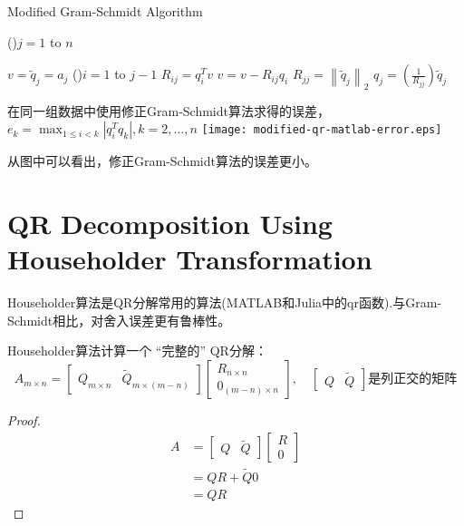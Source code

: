 \begin{example}
    \begin{algorithm}[htbp]
        \caption{Modified Gram-Schmidt Algorithm}
        \For(){$j=1$ to $n$}{
            $v={\tilde{q} }_j =a_j$\;
            \For(){$i=1$ to $j-1$}{
                $R_{ij} = q_i^T v$\;
                $v = v - R_{ij} q_i$\;
            }
            $R_{ jj} ={\left\|{\tilde{q} }_j \right\|}_2$\;
            $q_j =\left(\frac{1}{R_{jj} }\right){\tilde{q} }_j$\;

        }
    \end{algorithm}


    \begin{FigureCenter}{在同一组数据中使用修正Gram-Schmidt算法求得的误差，$e_{k}=\max _{1 \leq i<k}\left|q_{i}^{T} q_{k}\right|,  k=2, \ldots, n$}
        \texttt{[image: modified-qr-matlab-error.eps]}
    \end{FigureCenter}

    从图中可以看出，修正Gram-Schmidt算法的误差更小。
\end{example}

\section{QR Decomposition Using Householder Transformation}

Householder算法是QR分解常用的算法(MATLAB和Julia中的qr函数).与Gram-Schmidt相比，对舍入误差更有鲁棒性。

Householder算法计算一个 “完整的” QR分解：
\begin{equation} A_{m \times n}=\left[\begin{array}{ll}Q_{m \times n} & \tilde{Q}_{m \times (m-n)}\end{array}\right]\left[\begin{array}{l}R_{n  \times  n} \\ 0_{(m-n) \times n}\end{array}\right], \quad\left[\begin{array}{ll}Q & \tilde{Q}\end{array}\right]  是列正交的矩阵\end{equation}

\begin{proof}
    \begin{equation}
    \begin{aligned}
        A&=\left[\begin{array}{ll}Q & \tilde{Q}\end{array}\right]\left[\begin{array}{l}R \\ 0\end{array}\right]\\
        &=QR + \tilde{Q} 0 \\ 
        & = QR
    \end{aligned}
    \end{equation}
\end{proof}

